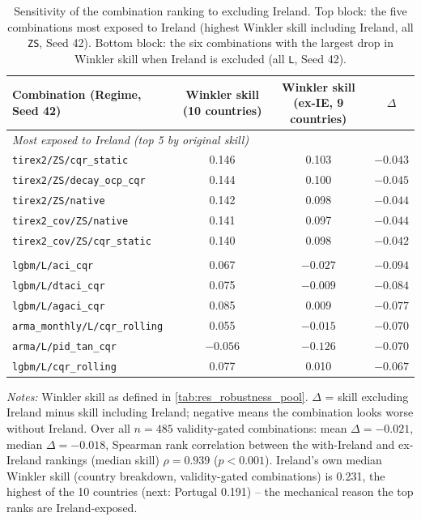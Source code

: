 \begin{table}[t]
\centering
\caption{Sensitivity of the combination ranking to excluding Ireland. Top block: the five combinations most exposed to Ireland (highest Winkler skill including Ireland, all \texttt{ZS}, Seed 42). Bottom block: the six combinations with the largest drop in Winkler skill when Ireland is excluded (all \texttt{L}, Seed 42).}
\label{tab:res_robustness_ie}
\begin{tabular}{lccc}
\toprule
Combination (Regime, Seed 42) & Winkler skill (10 countries) & Winkler skill (ex-IE, 9 countries) & $\Delta$ \\
\midrule
\multicolumn{4}{l}{\textit{Most exposed to Ireland (top 5 by original skill)}} \\
\texttt{tirex2/ZS/cqr\_static}      &  0.146 &  0.103 & $-0.043$ \\
\texttt{tirex2/ZS/decay\_ocp\_cqr}  &  0.144 &  0.100 & $-0.045$ \\
\texttt{tirex2/ZS/native}           &  0.142 &  0.098 & $-0.044$ \\
\texttt{tirex2\_cov/ZS/native}      &  0.141 &  0.097 & $-0.044$ \\
\texttt{tirex2\_cov/ZS/cqr\_static} &  0.140 &  0.098 & $-0.042$ \\
\addlinespace
\multicolumn{4}{l}{\textit{Largest drops (worst 6 by $\Delta$)}} \\
\texttt{lgbm/L/aci\_cqr}             &  0.067 & $-0.027$ & $-0.094$ \\
\texttt{lgbm/L/dtaci\_cqr}           &  0.075 & $-0.009$ & $-0.084$ \\
\texttt{lgbm/L/agaci\_cqr}           &  0.085 &  0.009   & $-0.077$ \\
\texttt{arma\_monthly/L/cqr\_rolling}&  0.055 & $-0.015$ & $-0.070$ \\
\texttt{arma/L/pid\_tan\_cqr}        & $-0.056$ & $-0.126$ & $-0.070$ \\
\texttt{lgbm/L/cqr\_rolling}         &  0.077 &  0.010   & $-0.067$ \\
\bottomrule
\end{tabular}

\vspace{3mm}
{\footnotesize\textit{Notes:} Winkler skill as defined in \cref{tab:res_robustness_pool}. $\Delta$ = skill excluding Ireland minus skill including Ireland; negative means the combination looks worse without Ireland. Over all $n=485$ validity-gated combinations: mean $\Delta = -0.021$, median $\Delta = -0.018$, Spearman rank correlation between the with-Ireland and ex-Ireland rankings (median skill) $\rho = 0.939$ ($p<0.001$). Ireland's own median Winkler skill (country breakdown, validity-gated combinations) is 0.231, the highest of the 10 countries (next: Portugal 0.191) -- the mechanical reason the top ranks are Ireland-exposed.}
\end{table}


